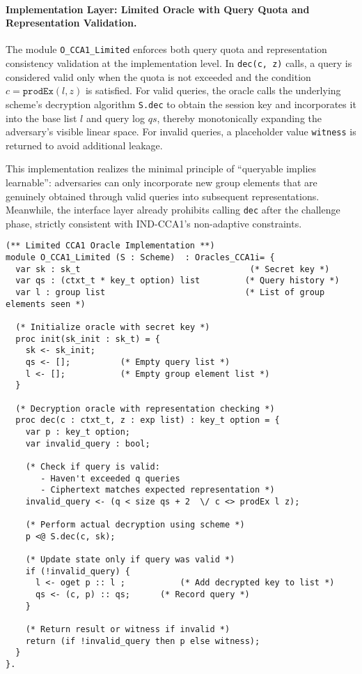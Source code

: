 \paragraph{Implementation Layer: Limited Oracle with Query Quota and Representation Validation.}

The module \texttt{O\_CCA1\_Limited} enforces both query quota and representation consistency validation at the implementation level. In \texttt{dec(c, z)} calls, a query is considered valid only when the quota is not exceeded and the condition $c = \texttt{prodEx}(l, z)$ is satisfied. For valid queries, the oracle calls the underlying scheme's decryption algorithm \texttt{S.dec} to obtain the session key and incorporates it into the base list $l$ and query log $qs$, thereby monotonically expanding the adversary's visible linear space. For invalid queries, a placeholder value \texttt{witness} is returned to avoid additional leakage.

This implementation realizes the minimal principle of ``queryable implies learnable'': adversaries can only incorporate new group elements that are genuinely obtained through valid queries into subsequent representations. Meanwhile, the interface layer already prohibits calling \texttt{dec} after the challenge phase, strictly consistent with IND-CCA1's non-adaptive constraints.

\begin{lstlisting}[style=easycrypt, caption=Limited Oracle Implementation with Validation, breaklines=true, breakatwhitespace=true, frame=single, keepspaces=true]
(** Limited CCA1 Oracle Implementation **)
module O_CCA1_Limited (S : Scheme)  : Oracles_CCA1i= {
  var sk : sk_t                                  (* Secret key *)
  var qs : (ctxt_t * key_t option) list         (* Query history *)
  var l : group list                            (* List of group elements seen *)

  (* Initialize oracle with secret key *)
  proc init(sk_init : sk_t) = {
    sk <- sk_init;
    qs <- [];          (* Empty query list *)
    l <- [];           (* Empty group element list *)
  }
  
  (* Decryption oracle with representation checking *)
  proc dec(c : ctxt_t, z : exp list) : key_t option = {
    var p : key_t option;
    var invalid_query : bool;

    (* Check if query is valid: 
       - Haven't exceeded q queries
       - Ciphertext matches expected representation *)
    invalid_query <- (q < size qs + 2  \/ c <> prodEx l z);

    (* Perform actual decryption using scheme *)
    p <@ S.dec(c, sk);

    (* Update state only if query was valid *)
    if (!invalid_query) {
      l <- oget p :: l ;           (* Add decrypted key to list *)
      qs <- (c, p) :: qs;      (* Record query *)
    }

    (* Return result or witness if invalid *)
    return (if !invalid_query then p else witness);
  }
}.
\end{lstlisting}

